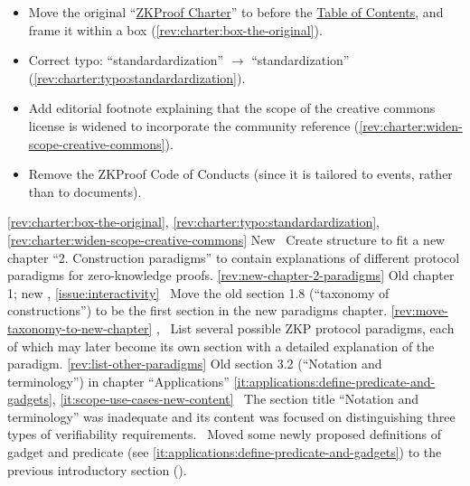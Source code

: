 				\begin{itemize}
				\item Move the original ``\hyperref[sec:prelim:charter]{ZKProof Charter}'' to before the \hyperref[prelim:contents]{Table of Contents}, and frame it within a box (\ref{rev:charter:box-the-original}).
				\item Correct typo: ``standardardization'' $\rightarrow$ ``standardization'' (\ref{rev:charter:typo:standardardization}).
				\item Add editorial footnote explaining that the scope of the creative commons license is widened to incorporate the community reference (\ref{rev:charter:widen-scope-creative-commons}).
				\item Remove the ZKProof Code of Conducts (since it is tailored to events, rather than to documents).
				\end{itemize}
\newcol \ref{rev:charter:box-the-original}, \ref{rev:charter:typo:standardardization}, \ref{rev:charter:widen-scope-creative-commons}
\rowendL
New 
\newcol 
\newcol {}
\newcol \Chan\ Create structure to fit a new chapter ``2. Construction paradigms'' to contain explanations 
	of different protocol paradigms for zero-knowledge proofs. 
\newcol \ref{rev:new-chapter-2-paradigms}
\rowendL
Old chapter 1; new 
\newcol 
\newcol {}, \ref{issue:interactivity}
\newcol \Chan\ Move the old section 1.8 (``taxonomy of constructions'') 
	to be the first section in the new paradigms chapter.
\newcol \ref{rev:move-taxonomy-to-new-chapter}
\rowendL
\newcol 
\newcol {}, 
\newcol \Chan\ List several possible ZKP protocol paradigms, each of which may later 
	become its own section with a detailed explanation of the paradigm.
\newcol \ref{rev:list-other-paradigms}
\rowendL
Old section 3.2 (``Notation and terminology'') in chapter ``Applications''
\newcol 
\newcol \ref{it:applications:define-predicate-and-gadgets}, \ref{it:scope-use-cases-new-content}
\newcol \Note\ The section title ``Notation and terminology'' was inadequate and its content was focused on distinguishing three types of verifiability requirements.
				\Chan\ Moved some newly proposed definitions of gadget and predicate (see \ref{it:applications:define-predicate-and-gadgets}) to the previous introductory section ().
